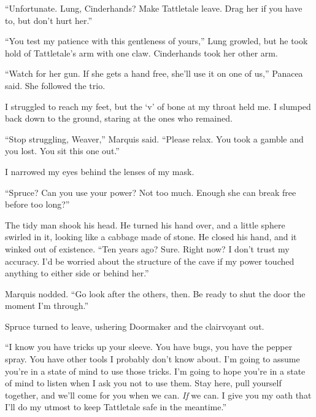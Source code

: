 ``Unfortunate.  Lung, Cinderhands?  Make Tattletale leave.  Drag her if you have to, but don't hurt her.''



``You test my patience with this gentleness of yours,'' Lung growled, but he took hold of Tattletale's arm with one claw.  Cinderhands took her other arm.



``Watch for her gun.  If she gets a hand free, she'll use it on one of us,'' Panacea said.  She followed the trio.



I struggled to reach my feet, but the `v' of bone at my throat held me.  I slumped back down to the ground, staring at the ones who remained.



``Stop struggling, Weaver,'' Marquis said.  ``Please relax.  You took a gamble and you lost.  You sit this one out.''



I narrowed my eyes behind the lenses of my mask.



``Spruce?  Can you use your power?  Not too much.  Enough she can break free before too long?''



The tidy man shook his head.  He turned his hand over, and a little sphere swirled in it, looking like a cabbage made of stone.  He closed his hand, and it winked out of existence.  ``Ten years ago?  Sure.  Right now?  I don't trust my accuracy.  I'd be worried about the structure of the cave if my power touched anything to either side or behind her.''



Marquis nodded.  ``Go look after the others, then.  Be ready to shut the door the moment I'm through.''



Spruce turned to leave, ushering Doormaker and the clairvoyant out.



``I know you have tricks up your sleeve.  You have bugs, you have the pepper spray.  You have other tools I probably don't know about.  I'm going to assume you're in a state of mind to use those tricks.  I'm going to hope you're in a state of mind to listen when I ask you not to use them.  Stay here, pull yourself together, and we'll come for you when we can.  \emph{If} we can.  I give you my oath that I'll do my utmost to keep Tattletale safe in the meantime.''



